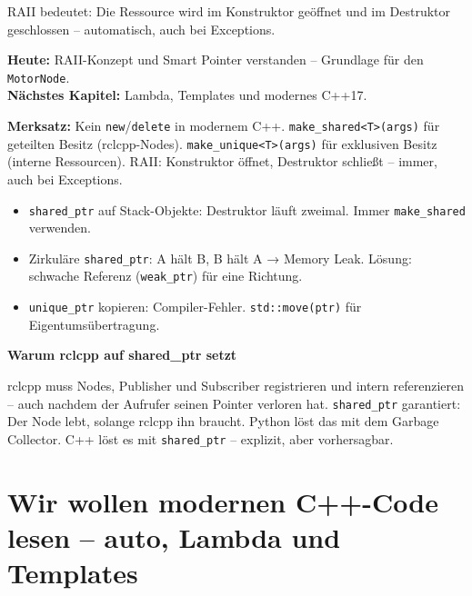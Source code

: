 RAII bedeutet: Die Ressource wird im Konstruktor geöffnet
und im Destruktor geschlossen -- automatisch, auch bei Exceptions.

\begin{projektBox}
\textbf{Heute:} RAII-Konzept und Smart Pointer verstanden --
Grundlage für den \texttt{MotorNode}.\\
\textbf{Nächstes Kapitel:} Lambda, Templates und modernes C++17.
\end{projektBox}

\begin{merksatzBox}
\textbf{Merksatz:}
Kein \texttt{new}/\texttt{delete} in modernem C++.
\texttt{make\_shared<T>(args)} für geteilten Besitz (rclcpp-Nodes).
\texttt{make\_unique<T>(args)} für exklusiven Besitz (interne Ressourcen).
RAII: Konstruktor öffnet, Destruktor schließt -- immer, auch bei Exceptions.
\end{merksatzBox}

\begin{fehlerBox}
\begin{itemize}
\item \texttt{shared\_ptr} auf Stack-Objekte: Destruktor läuft zweimal.
  Immer \texttt{make\_shared} verwenden.
\item Zirkuläre \texttt{shared\_ptr}: A hält B, B hält A → Memory Leak.
  Lösung: schwache Referenz (\texttt{weak\_ptr}) für eine Richtung.
\item \texttt{unique\_ptr} kopieren: Compiler-Fehler.
  \texttt{std::move(ptr)} für Eigentumsübertragung.
\end{itemize}
\end{fehlerBox}

\begin{haubeBox}
\textbf{Warum rclcpp auf shared\_ptr setzt}

rclcpp muss Nodes, Publisher und Subscriber registrieren
und intern referenzieren -- auch nachdem der Aufrufer
seinen Pointer verloren hat.
\texttt{shared\_ptr} garantiert: Der Node lebt, solange rclcpp ihn braucht.
Python löst das mit dem Garbage Collector.
C++ löst es mit \texttt{shared\_ptr} -- explizit, aber vorhersagbar.
\end{haubeBox}


\chapter{Wir wollen modernen C++-Code lesen –
  auto, Lambda und Templates}

